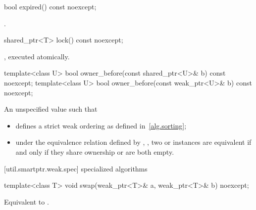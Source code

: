 %
\begin{itemdecl}
bool expired() const noexcept;
\end{itemdecl}

\begin{itemdescr}
\pnum\returns  {}.
\end{itemdescr}

%
\begin{itemdecl}
shared_ptr<T> lock() const noexcept;
\end{itemdecl}

\begin{itemdescr}
\pnum
\returns {}, executed atomically.
\end{itemdescr}

%
\begin{itemdecl}
template<class U> bool owner_before(const shared_ptr<U>& b) const noexcept;
template<class U> bool owner_before(const weak_ptr<U>& b) const noexcept;
\end{itemdecl}

\begin{itemdescr}
\pnum
\returns An unspecified value such that

\begin{itemize}
\item {} defines a strict weak ordering as defined in~\ref{alg.sorting};

\item under the equivalence relation defined by ,
, two  or
 instances are equivalent if and only if they share ownership or are
both empty.
\end{itemize}
\end{itemdescr}


[util.smartptr.weak.spec]{ specialized algorithms}

%
\begin{itemdecl}
template<class T>
  void swap(weak_ptr<T>& a, weak_ptr<T>& b) noexcept;
\end{itemdecl}

\begin{itemdescr}
\pnum\effects  Equivalent to .
\end{itemdescr}

